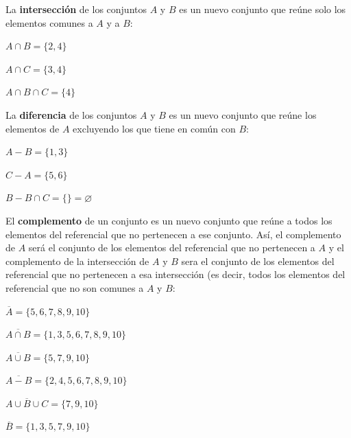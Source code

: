 \documentclass[12pt]{article}
\theoremstyle{definition}
\begin{document}
\begin{enumerate}
\noindent
La  \textbf{intersección} de los conjuntos $A$ y $B$ es un nuevo conjunto que reúne solo los elementos comunes a $A$ y a $B$:\\
\begin{itemize*}
\item  $A \cap B= \{2, 4 \}$ \\
\item  $A \cap C= \{3, 4 \}$ \\
\item  $A \cap B \cap C= \{4 \}$ 
\end{itemize*}

\noindent
La  \textbf{diferencia} de los conjuntos $A$ y $B$ es un nuevo conjunto que reúne los elementos de $A$  excluyendo los que tiene en común con $B$:\\
\begin{itemize*}
\item  $A - B= \{1, 3 \}$ \\
\item  $C - A= \{5, 6 \}$ \\
\item  $B - B \cap C= \{ \} =\varnothing $ 
\end{itemize*}

\noindent
El \textbf{complemento} de un conjunto es un nuevo conjunto que reúne a todos los elementos del referencial que no pertenecen a ese conjunto. Así, el complemento de $A$ será el conjunto de los elementos del referencial que no pertenecen a $A$ y el complemento de la intersección de $A$ y $B$ sera el conjunto de los elementos del referencial que no pertenecen a esa intersección (es decir, todos los elementos del referencial que no son comunes a $A$ y $B$:\\
\begin{itemize*}
\item $ \overline {A}= \{5, 6, 7, 8, 9, 10\}$ \\ 
\item $ \overline {A \cap B}= \{1, 3, 5, 6, 7, 8, 9, 10\}$ \\
\item $ \overline {A \cup B}= \{5, 7, 9, 10\}$  \\
\item $ \overline {A - B}= \{2, 4, 5, 6, 7, 8, 9, 10\}$ \\
\item $ \overline {A \cup B \cup C}= \{7, 9, 10\}$ \\
\item $ \overline {B}= \{1, 3, 5, 7, 9, 10\}$ 
\end{itemize*}\\


\end{enumerate}
\end{document}
